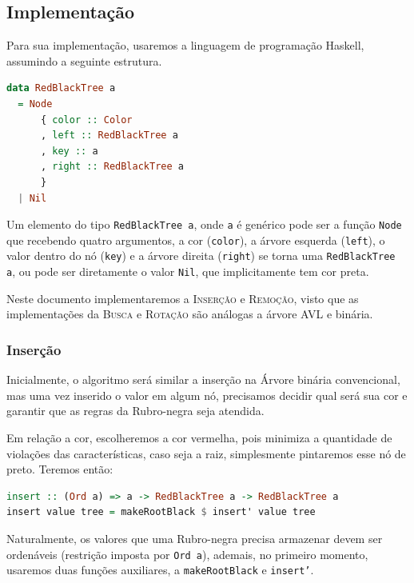 \subsection{Implementação}

Para sua implementação, usaremos a linguagem de programação Haskell, assumindo a seguinte estrutura.

\begin{lstlisting}[language=haskell]
data RedBlackTree a
  = Node
      { color :: Color
      , left :: RedBlackTree a
      , key :: a
      , right :: RedBlackTree a
      }
  | Nil
\end{lstlisting}

Um elemento do tipo \texttt{RedBlackTree a}, onde \texttt{a} é genérico pode ser a função \texttt{Node} que recebendo quatro argumentos, a cor (\texttt{color}), a árvore esquerda (\texttt{left}), o valor dentro do nó (\texttt{key}) e a árvore direita (\texttt{right}) se torna uma \texttt{RedBlackTree a}, ou pode ser diretamente o valor \texttt{Nil}, que implicitamente tem cor preta.

Neste documento implementaremos a \textrm{I\textsc{nserção}} e \textrm{R\textsc{emoção}}, visto que as implementações da \textrm{B\textsc{usca}} e \textrm{R\textsc{otação}} são análogas a árvore AVL e binária.

\subsubsection{Inserção}

Inicialmente, o algoritmo será similar a inserção na Árvore binária convencional, mas uma vez inserido o valor em algum nó, precisamos decidir qual será sua cor e garantir que as regras da Rubro-negra seja atendida.

Em relação a cor, escolheremos a cor vermelha, pois minimiza a quantidade de violações das características, caso seja a raiz, simplesmente pintaremos esse nó de preto. Teremos então:

\begin{lstlisting}[language=haskell]
insert :: (Ord a) => a -> RedBlackTree a -> RedBlackTree a
insert value tree = makeRootBlack $ insert' value tree
\end{lstlisting}
\FloatBarrier

Naturalmente, os valores que uma Rubro-negra precisa armazenar devem ser ordenáveis (restrição imposta por \texttt{Ord a}), ademais, no primeiro momento, usaremos duas funções auxiliares, a \texttt{makeRootBlack} e \texttt{insert'}.

